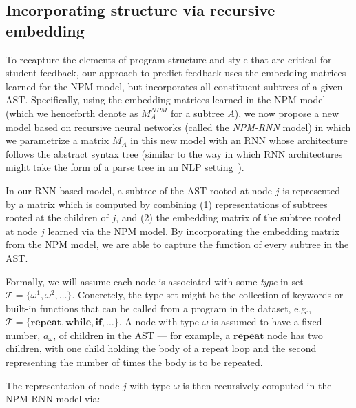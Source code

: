 \subsection{Incorporating structure via
    recursive embedding}
To recapture the elements of program structure and style 
that are critical for student feedback, our approach to predict feedback uses
the embedding matrices learned for the NPM model, but incorporates
all constituent subtrees of a given AST.
Specifically, using the embedding matrices learned in the NPM model
(which we henceforth denote as $M^{NPM}_A$ for a subtree $A$),
we now propose a new model
based on recursive neural networks (called the \emph{NPM-RNN} model)
in which
we parametrize a matrix $M_A$ in this new model
with an RNN whose
architecture follows the abstract syntax tree 
(similar to the way in which RNN architectures might take the form of a parse tree in an NLP 
setting~\cite{socher2013recursive}).

In our RNN based model, %
a subtree of the 
AST rooted at node $j$ is represented
by a matrix which is computed by combining (1) representations of subtrees rooted
at the children of $j$, and (2) the embedding matrix of the subtree
rooted at node $j$ learned via the NPM model.
By incorporating the embedding matrix from the NPM model, we are able to capture the function of every subtree in the AST.

Formally, we will assume each node is associated with some \emph{type}
in set $\mathcal{T}=\{\omega^1, \omega^2,\dots\}$.  Concretely, the type set might
be the collection of keywords or built-in functions that can be called from a program 
in the dataset, e.g., $\mathcal{T}=\{\mathbf{repeat}, \mathbf{while}, \mathbf{if}, \dots\}$.
A node with type $\omega$ is assumed to have a fixed number, $a_\omega$, of children in the AST --- 
for example, a $\mathbf{repeat}$ node has two children, with one child holding the body
of a repeat loop and the second representing the number of times the body is
to be repeated.   

The representation of node $j$ with type $\omega$ 
is then recursively computed in the NPM-RNN model via:

